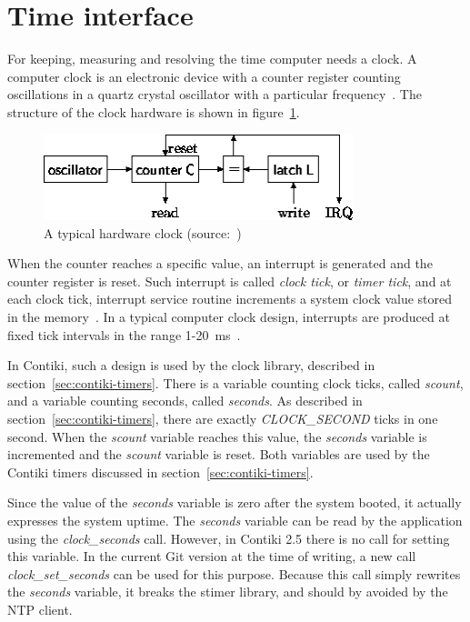 
\section{Time interface}\label{sec:analysis-time}
For keeping, measuring and resolving the time computer needs a clock.
A computer clock is an electronic device with a counter register counting oscillations in a
quartz crystal oscillator with a particular frequency~\cite{thesis-sync}.
The structure of the clock hardware is shown in figure~\ref{fig:system-hardware-clock}.
\begin{figure}
  \centering
  \includegraphics[width=9cm,keepaspectratio]{fig/pc-clock.png}
  \caption{A typical hardware clock (source:~\cite{thesis-beat})}
  \label{fig:system-hardware-clock}
\end{figure}
When the counter reaches a specific value, an interrupt is generated and the counter register is reset.
Such interrupt is called {\it{clock tick}}, or {\it{timer tick}}, and at each clock tick,
interrupt service routine increments a system clock value stored in the memory~\cite{thesis-sync}.
In a typical computer clock design, interrupts are produced at
fixed tick intervals in the range 1-20~ms~\cite{nanokernel}.

In Contiki, such a design is used by the clock library, described in section~\ref{sec:contiki-timers}.
There is a variable counting clock ticks, called {\it{scount}},
and a variable counting seconds, called {\it{seconds}}.
As described in section~\ref{sec:contiki-timers}, there are
exactly {\it{CLOCK\_SECOND}} ticks in one second.
When the {\it{scount}} variable reaches this value,
the {\it{seconds}} variable is incremented and the {\it{scount}} variable is reset.
Both variables are used by the Contiki timers discussed in section~\ref{sec:contiki-timers}.

Since the value of the {\it{seconds}} variable is zero after the system booted,
it actually expresses the system uptime.
The {\it{seconds}} variable can be read by the application using the {\it{clock\_seconds}} call.
However, in Contiki 2.5 there is no call for setting this variable.
In the current Git version at the time of writing, a new call {\it{clock\_set\_seconds}}
can be used for this purpose.
Because this call simply rewrites the {\it{seconds}} variable, it breaks the stimer library,
and should by avoided by the NTP client.

